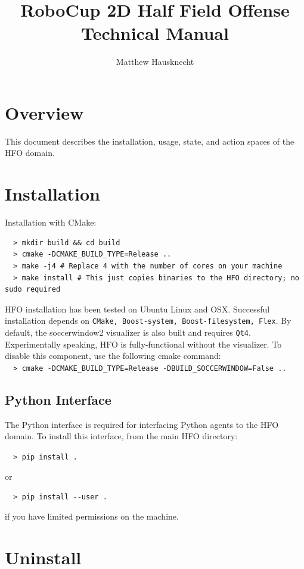 \documentclass[12pt]{article}
\title{RoboCup 2D Half Field Offense \\ Technical Manual}
\author{Matthew Hausknecht}
\begin{document}
\maketitle
\tableofcontents

\section{Overview}

This document describes the installation, usage, state, and action spaces of the HFO domain.

\section{Installation}

Installation with CMake:

\begin{verbatim}
  > mkdir build && cd build
  > cmake -DCMAKE_BUILD_TYPE=Release ..
  > make -j4 # Replace 4 with the number of cores on your machine
  > make install # This just copies binaries to the HFO directory; no sudo required
\end{verbatim}

HFO installation has been tested on Ubuntu Linux and OSX. Successful
installation depends on
\verb+CMake, Boost-system, Boost-filesystem, Flex+. By default, the
soccerwindow2 visualizer is also built and requires
\verb+Qt4+. Experimentally speaking, HFO is fully-functional without
the visualizer. To disable this component, use the following cmake
command:\\

\noindent \verb+  > cmake -DCMAKE_BUILD_TYPE=Release -DBUILD_SOCCERWINDOW=False ..+

\subsection{Python Interface}

The Python interface is required for interfacing Python agents to the
HFO domain. To install this interface, from the main HFO directory:

\noindent \verb+  > pip install .+

or

\noindent \verb+  > pip install --user .+

if you have limited permissions on the machine.

\section{Uninstall}
\end{document}
